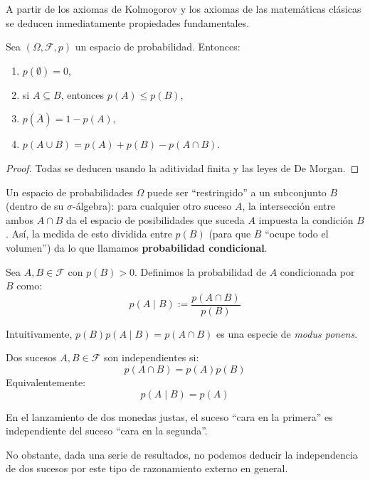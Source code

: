 \documentclass[10pt]{article}
\begin{document}
A partir de los axiomas de Kolmogorov y los axiomas de las matemáticas clásicas 
se deducen inmediatamente propiedades fundamentales.

\begin{theorem}
  Sea $(\Omega, \mathcal{F}, p)$ un espacio de probabilidad. Entonces:
  \begin{enumerate}
    \item $p(\emptyset) = 0$,
    \item si $A \subseteq B$, entonces $p(A) \le p(B)$,
    \item $p(\bar{A}) = 1 - p(A)$,
    \item $p(A \cup B) = p(A) + p(B) - p(A \cap B)$.
  \end{enumerate}
\end{theorem}

\begin{proof}
  Todas se deducen usando la aditividad finita y las leyes de De Morgan.
\end{proof}

Un espacio de probabilidades $ \Omega $ puede ser ``restringido'' a un subconjunto $ B $ (dentro de su $ \sigma $-álgebra): para cualquier otro suceso $ A $, la intersección
entre ambos $ A \cap B $ da el espacio de posibilidades que suceda $ A $ impuesta la condición $ B $. Así, la medida de esto dividida entre $ p(B) $ (para que $ B $ ``ocupe todo
el volumen'') da lo que llamamos \textbf{probabilidad condicional}.

\begin{definition}
  Sea $A, B \in \mathcal{F}$ con $p(B) > 0$. Definimos la probabilidad de $A$ condicionada por $B$ como:
  \[ p(A \mid B) := \frac{p(A \cap B)}{p(B)} \]
\end{definition}

\begin{remark}
  Intuitivamente, $ p(B)p(A \mid B) = p(A \cap B) $ es una especie de \textit{modus ponens}.
\end{remark}

\begin{definition}[Independencia]
  Dos sucesos $A, B \in \mathcal{F}$ son independientes si:
  \[ p(A \cap B) = p(A)p(B) \]
  Equivalentemente:
  \[ p(A \mid B) = p(A) \]
\end{definition}

\begin{example}
  En el lanzamiento de dos monedas justas, el suceso “cara en la primera” es independiente del suceso “cara en la segunda”.

  No obstante, dada una serie de resultados, no podemos deducir la independencia de dos sucesos por este tipo de razonamiento externo en general.
\end{example}
\end{document}
